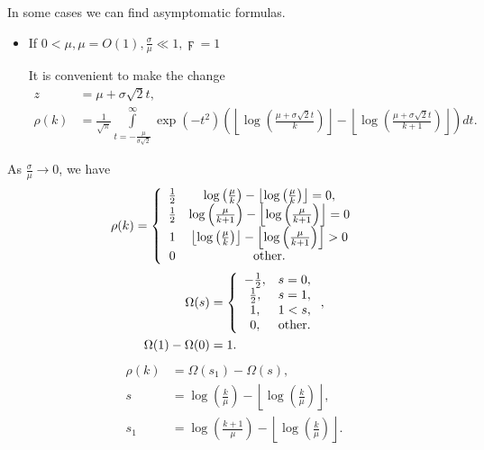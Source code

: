 \documentclass[titlepage,fleqn]{article}%
\begin{document}
In some cases we can find asymptomatic formulas.

\begin{itemize}
\item If $0<\mu,\mu=O(1),\frac{\sigma}{\mu}$\bigskip$\ll1,\digamma=1$

It is convenient to make the change%
\begin{align*}
z  &  =\mu+\sigma\sqrt{2}t,\\
\rho(k)  &  =\frac{1}{\sqrt{\pi}}%
{\displaystyle\int\limits_{t=-\frac{\mu}{\sigma\sqrt{2}}}^{\infty}}
\exp\left(  -t^{2}\right)  \left(  \left\lfloor \log\left(  \frac{\mu
+\sigma\sqrt{2}t}{k}\right)  \right\rfloor -\left\lfloor \log\left(  \frac
{\mu+\sigma\sqrt{2}t}{k+1}\right)  \right\rfloor \right)  dt.
\end{align*}

\end{itemize}

As $\frac{\sigma}{\mu}\rightarrow0$, we have%
\begin{equation}
\rho(k)=\left\{
\begin{array}
[c]{cc}%
\frac{1}{2} & \log\left(  \frac{\mu}{k}\right)  -\left\lfloor \log\left(
\frac{\mu}{k}\right)  \right\rfloor =0,\\
\frac{1}{2} & \log\left(  \frac{\mu}{k+1}\right)  -\left\lfloor \log\left(
\frac{\mu}{k+1}\right)  \right\rfloor =0\\
1 & \left\lfloor \log\left(  \frac{\mu}{k}\right)  \right\rfloor -\left\lfloor
\log\left(  \frac{\mu}{k+1}\right)  \right\rfloor >0\\
0 & \text{other}.
\end{array}
\right.  \label{NormD1}%
\end{equation}%
\begin{align*}
\Omega(s)  &  =\left\{
\begin{array}
[c]{cc}%
-\frac{1}{2}, & s=0,\\
\frac{1}{2}, & s=1,\\
1, & 1<s,\\
0, & \text{other}.
\end{array}
\right.  ,\\
\Omega(1)-\Omega(0)  &  =1.
\end{align*}%
\begin{align*}
\rho(k)  &  =\Omega(s_{1})-\Omega(s),\\
s  &  =\log\left(  \frac{k}{\mu}\right)  -\left\lfloor \log\left(  \frac
{k}{\mu}\right)  \right\rfloor ,\\
s_{1}  &  =\log\left(  \frac{k+1}{\mu}\right)  -\left\lfloor \log\left(
\frac{k}{\mu}\right)  \right\rfloor .
\end{align*}
\newline
\end{document}
